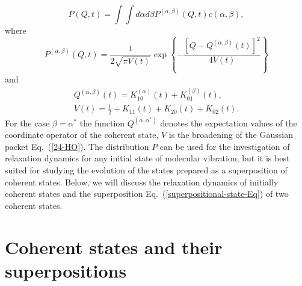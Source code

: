 \documentclass[12pt,twoside,a4paper]{report}
\begin{document}
\begin{equation}
  P\left( Q,t\right) =\int \int d\alpha d\beta P^{(\alpha ,\beta
    )}\left( Q,t\right) c(\alpha ,\beta ), \label{23-HO}
\end{equation}
where
\begin{equation}
P^{(\alpha ,\beta )}\left( Q,t\right) =\frac 1{2\sqrt{\pi V\left( t\right) }%
}\exp \left\{ 
          -\frac
              {
               \left[ 
                    Q-Q^{(\alpha ,\beta )}\left( t\right) 
               \right]^2
              }
              {
               4V\left( t\right) 
              }
      \right\} \label{24-HO}
\end{equation}
and
\begin{eqnarray}
  Q^{(\alpha ,\beta )}
   \left( t\right) 
                      =  
                          K_{10}^{(\alpha )}\left(t\right) 
                        + K_{01}^{(\beta )}\left( t\right) , \label{25-HO} \\ 
 V\left( t\right)
                      =   \frac12
                        + K_{11}\left( t\right) 
                        + K_{20}\left( t\right) 
                        + K_{02}\left( t\right) .
\end{eqnarray}
For the case $\beta =\alpha ^{*}$ the function 
$Q^{\left( \alpha,\alpha ^{*}\right) }$ 
denotes the expectation values of the
coordinate operator of the coherent state, $V$ 
is the broadening of the Gaussian packet Eq.~(\ref{24-HO}). 
The distribution $P$ can be used for the
investigation of relaxation dynamics for any initial state of
molecular vibration, but it is best suited for studying the
evolution of the states prepared as a superposition of coherent states.
Below, we will discuss the relaxation dynamics of initially 
coherent states and the superposition Eq.~(\ref{superpositional-state-Eq}) 
of two coherent states.

\section{Coherent states and their superpositions} \label{quant-dynam}
\end{document}
